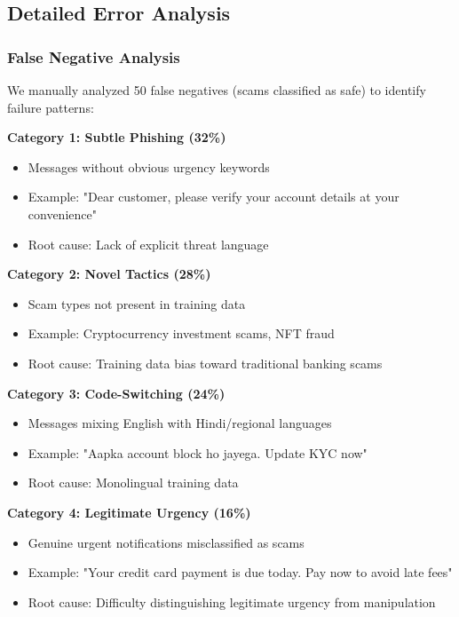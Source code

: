 \subsection{Detailed Error Analysis}

\subsubsection{False Negative Analysis}

We manually analyzed 50 false negatives (scams classified as safe) to identify failure patterns:

\textbf{Category 1: Subtle Phishing (32\%)}
\begin{itemize}
    \item Messages without obvious urgency keywords
    \item Example: "Dear customer, please verify your account details at your convenience"
    \item Root cause: Lack of explicit threat language
\end{itemize}

\textbf{Category 2: Novel Tactics (28\%)}
\begin{itemize}
    \item Scam types not present in training data
    \item Example: Cryptocurrency investment scams, NFT fraud
    \item Root cause: Training data bias toward traditional banking scams
\end{itemize}

\textbf{Category 3: Code-Switching (24\%)}
\begin{itemize}
    \item Messages mixing English with Hindi/regional languages
    \item Example: "Aapka account block ho jayega. Update KYC now"
    \item Root cause: Monolingual training data
\end{itemize}

\textbf{Category 4: Legitimate Urgency (16\%)}
\begin{itemize}
    \item Genuine urgent notifications misclassified as scams
    \item Example: "Your credit card payment is due today. Pay now to avoid late fees"
    \item Root cause: Difficulty distinguishing legitimate urgency from manipulation
\end{itemize}

